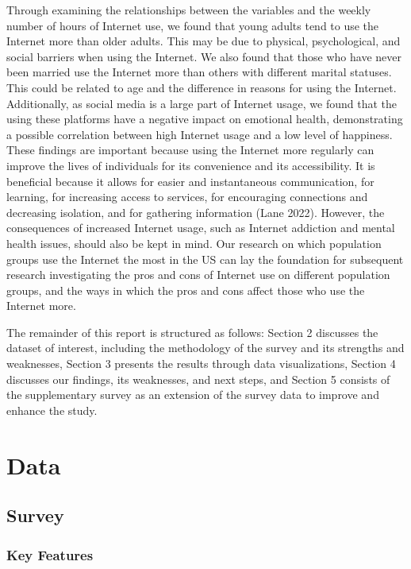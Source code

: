 \documentclass[
]{article}
\begin{document}
Through examining the relationships between the variables and the weekly
number of hours of Internet use, we found that young adults tend to use
the Internet more than older adults. This may be due to physical,
psychological, and social barriers when using the Internet. We also
found that those who have never been married use the Internet more than
others with different marital statuses. This could be related to age and
the difference in reasons for using the Internet. Additionally, as
social media is a large part of Internet usage, we found that the using
these platforms have a negative impact on emotional health,
demonstrating a possible correlation between high Internet usage and a
low level of happiness. These findings are important because using the
Internet more regularly can improve the lives of individuals for its
convenience and its accessibility. It is beneficial because it allows
for easier and instantaneous communication, for learning, for increasing
access to services, for encouraging connections and decreasing
isolation, and for gathering information (Lane 2022). However, the
consequences of increased Internet usage, such as Internet addiction and
mental health issues, should also be kept in mind. Our research on which
population groups use the Internet the most in the US can lay the
foundation for subsequent research investigating the pros and cons of
Internet use on different population groups, and the ways in which the
pros and cons affect those who use the Internet more.

The remainder of this report is structured as follows: Section 2
discusses the dataset of interest, including the methodology of the
survey and its strengths and weaknesses, Section 3 presents the results
through data visualizations, Section 4 discusses our findings, its
weaknesses, and next steps, and Section 5 consists of the supplementary
survey as an extension of the survey data to improve and enhance the
study.

\hypertarget{sec-data}{%
\section{Data}\label{sec-data}}

\hypertarget{survey}{%
\subsection{Survey}\label{survey}}

\hypertarget{key-features}{%
\subsubsection{Key Features}\label{key-features}}
\end{document}
